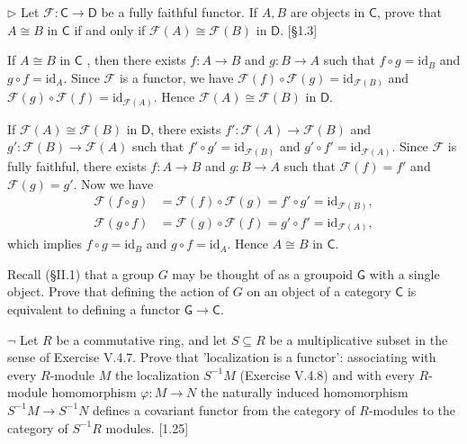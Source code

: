 \documentclass[12pt,letterpaper,boxed]{hmcpset}
\begin{document}
\begin{problem}[1.2]
$\triangleright$ Let $\mathscr{F}: \mathsf{C} \rightarrow \mathsf{D}$ be a fully faithful functor. If $A, B$ are objects in $\mathsf{C}$, prove that $A \cong B$ in $\mathsf{C}$ if and only if $\mathscr{F}(A) \cong \mathscr{F}(B)$ in $\mathsf{D}$. [\S1.3]
\end{problem}
\begin{solution}
	If  $A \cong B$ in $\mathsf{C}$ , then there exists $f:A\to B$ and $g:B\to A$ such that $f\circ g=\mathrm{id}_B$ and $g\circ f=\mathrm{id}_A$. Since $\mathscr{F}$ is a functor, we have $\mathscr{F}(f)\circ\mathscr{F}(g)=\mathrm{id}_{\mathscr{F}(B)}$
	and $\mathscr{F}(g)\circ\mathscr{F}(f)=\mathrm{id}_{\mathscr{F}(A)}$. Hence  $\mathscr{F}(A) \cong \mathscr{F}(B)$ in $\mathsf{D}$.

	If $\mathscr{F}(A) \cong \mathscr{F}(B)$ in $\mathsf{D}$, there exists $f':\mathscr{F}(A)\to\mathscr{F}(B)$ and $g':\mathscr{F}(B)\to\mathscr{F}(A)$ such that $f'\circ g'=\mathrm{id}_{\mathscr{F}(B)}$ and $g'\circ f'=\mathrm{id}_{\mathscr{F}(A)}$. Since $\mathscr{F}$ is fully faithful, there exists $f:A\to B$ and $g:B\to A$ such that $\mathscr{F}(f)=f'$ and $\mathscr{F}(g)=g'$. Now we have
	\begin{align*}
		\mathscr{F}\left(f\circ g\right)&=\mathscr{F}(f)\circ\mathscr{F}(g)=f'\circ g'=\mathrm{id}_{\mathscr{F}(B)},\\
		\mathscr{F}\left(g\circ f\right)&=\mathscr{F}(g)\circ\mathscr{F}(f)=g'\circ f'=\mathrm{id}_{\mathscr{F}(A)},
	\end{align*}
	which implies $f\circ g=\mathrm{id}_B$ and $g\circ f=\mathrm{id}_A$. Hence $A \cong B$ in $\mathsf{C}$.
\end{solution}


\begin{problem}[1.3]
Recall (\S II.1) that a group $G$ may be thought of as a groupoid $\mathsf{G}$ with a single object. Prove that defining the action of $G$ on an object of a category $\mathsf{C}$ is equivalent to defining a functor $\mathsf{G} \rightarrow \mathsf{C}$.
\end{problem}
\begin{solution}
\end{solution}

\begin{problem}[1.4]
$\neg$ Let $R$ be a commutative ring, and let $S \subseteq R$ be a multiplicative subset in the sense of Exercise V.4.7. Prove that 'localization is a functor': associating with every $R$-module $M$ the localization $S^{-1} M$ (Exercise V.4.8) and with every $R$-module homomorphism $\varphi: M \rightarrow N$ the naturally induced homomorphism $S^{-1} M \rightarrow S^{-1} N$ defines a covariant functor from the category of $R$-modules to the category of $S^{-1} R$ modules. [1.25]
\end{problem}
\begin{solution}
\end{solution}
\newpage
\end{document}

